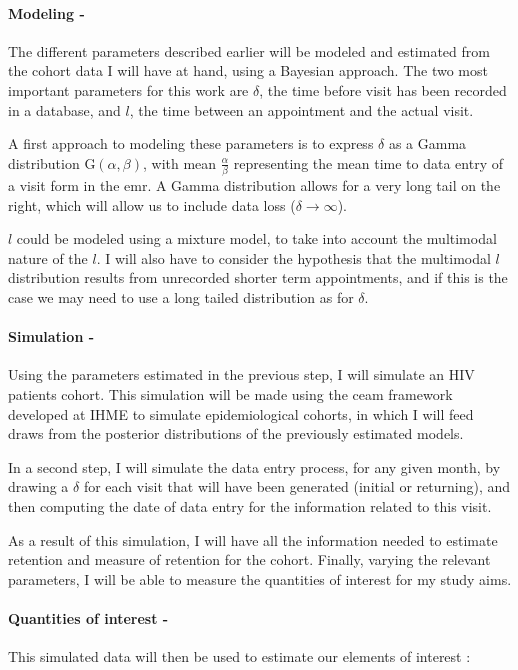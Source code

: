 \paragraph{Modeling -} The different parameters described earlier will be modeled and estimated  from the cohort data I will have at hand, using a Bayesian approach. The two most important parameters for this work are $\delta$, the time before visit has been recorded in a database, and $l$, the time between an appointment and the actual visit.

A first approach to modeling these parameters is to express $\delta$ as a Gamma distribution $\mathrm{G}(\alpha , \beta)$, with mean $\frac{\alpha}{\beta}$ representing the mean time to data entry of a visit form in the \gls{emr}. A Gamma distribution allows for a very long tail on the right, which will allow us to include data loss ($\delta  \rightarrow  \infty$).

$l$ could be modeled using a mixture model, to take into account the multimodal nature of the $l$. I will also have to consider the hypothesis that the multimodal $l$ distribution results from unrecorded shorter term appointments, and if this is the case we may need to use a long tailed distribution as for $\delta$.

\paragraph{Simulation - } Using the parameters estimated in the previous step, I will simulate an HIV patients cohort. This simulation will be made using the \gls{ceam} framework developed at IHME to simulate epidemiological cohorts, in which I will feed draws from the posterior distributions of the previously estimated models.

In a second step, I will simulate the data entry process, for any given month, by drawing a $\delta$ for each visit that will have been generated (initial or returning), and then computing the date of data entry for the information related to this visit.

As a result of this simulation, I will have all the information needed to estimate retention and measure of retention for the cohort. Finally, varying the relevant parameters, I will be able to measure the quantities of interest for my study aims.

\paragraph{Quantities of interest -} This simulated data will then be used to estimate our elements of interest :

